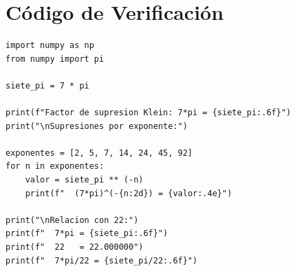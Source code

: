 \section*{Código de Verificación}

\begin{lstlisting}[caption={Verificación numérica - Capítulo 2}]
import numpy as np
from numpy import pi

siete_pi = 7 * pi

print(f"Factor de supresion Klein: 7*pi = {siete_pi:.6f}")
print("\nSupresiones por exponente:")

exponentes = [2, 5, 7, 14, 24, 45, 92]
for n in exponentes:
    valor = siete_pi ** (-n)
    print(f"  (7*pi)^(-{n:2d}) = {valor:.4e}")

print("\nRelacion con 22:")
print(f"  7*pi = {siete_pi:.6f}")
print(f"  22   = 22.000000")
print(f"  7*pi/22 = {siete_pi/22:.6f}")
\end{lstlisting}
